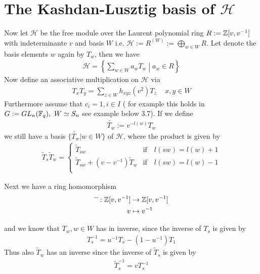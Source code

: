 \documentclass[]{article}
\begin{document}
\section{The Kashdan-Lusztig basis of \(\mathscr{H}\)}

Now let \(\mathscr{H}\) be the free module over the Laurent polynomial ring \(R:={\mathbb{Z}}[v,v^{-1}]\) with indeterminante \(v\) and basis \(W\)
i.e. \(\mathscr{H}:=R^{(W)}:= \bigoplus_{w \in W} R \). Let denote the basis elements \(w\) again by \(T_w\), then we have
\begin{align*}
    \mathscr{H}= \left\{\sum_{w \in W}^{}a_w T_w \middle| a_w \in R\right\}
\end{align*}
Now define an associative multiplication on \(\mathscr{H}\) via
\begin{align*}
    T_x T_y = \sum_{z \in W}^{}h_{xyz}(v^2)T_z \, \quad x,y \in W
\end{align*}
Furthermore assume that \(c_i = 1, i \in I\) ( for example this holds in \(G:= GL_n(\F_q), \ W \simeq S_n\) see example below 3.7).
If we define
\begin{align*}
    \widetilde{T_w}:=v^{-l(w)}T_w
\end{align*}
we still have a basis \(\{\widetilde{T_w} | w \in W\}\) of \(\mathscr{H}\), where the product is given by
\begin{align*}
    \widetilde{T}_{s} \widetilde{T}_w =
    \begin{cases}
        \widetilde{T}_{s w}& \text{if} \quad l(s w) = l(w) +1 \\
        \widetilde{T}_{s w}+(v-v^{-1})\widetilde{T}_w & \text{if} \quad l(s w)= l(w)-1 \\
    \end{cases}
\end{align*}

Next we have a ring homomorphism 
\begin{align*}
    \overline{\phantom{x}}: {\mathbb{Z}}[v,v^{-1}] &\rightarrow {\mathbb{Z}}[v,v^{-1}] \\
    v &\mapsto v^{-1}
\end{align*}

and we know that \(T_w, w \in W\) has in inverse, since the inverse of \(T_s\) is given by
\begin{align*}
    T_s^{-1}=u^{-1}T_s-(1-u^{-1})T_1
\end{align*}
Thus also \(\widetilde{T}_w\) has an inverse since the inverse of \(\widetilde{T}_s\) is given by
\begin{align*}
    \widetilde{T}_s^{-1} = v T_s^{-1}
\end{align*}
\end{document}
